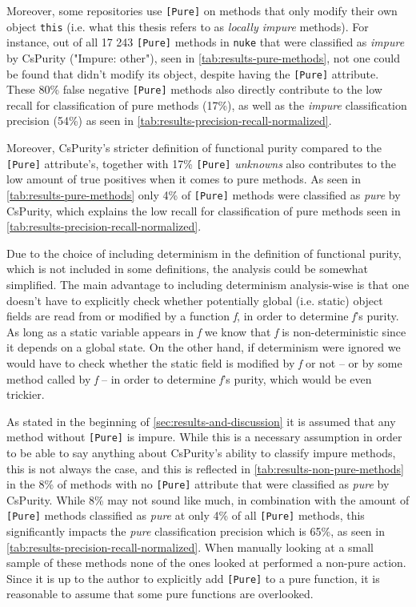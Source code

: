 \documentclass[a4paper,12pt]{article}
\begin{document}
Moreover, some repositories use \texttt{[Pure]} on methods that only modify their own object \texttt{this} (i.e. what this thesis refers to as \textit{locally impure} methods). For instance, out of all 17 243 \texttt{[Pure]} methods in \texttt{nuke} that were classified as \textit{impure} by CsPurity ("Impure: other"), seen in \autoref{tab:results-pure-methods}, not one could be found that didn't modify its object, despite having the \texttt{[Pure]} attribute. These 80\% false negative \texttt{[Pure]} methods also directly contribute to the low recall for classification of pure methods (17\%), as well as the \textit{impure} classification precision (54\%) as seen in \autoref{tab:results-precision-recall-normalized}.

Moreover, CsPurity's stricter definition of functional purity compared to the \texttt{[Pure]} attribute's, together with 17\% \texttt{[Pure]} \textit{unknowns} also contributes to the low amount of true positives when it comes to pure methods. As seen in \autoref{tab:results-pure-methods} only 4\% of \texttt{[Pure]} methods were classified as \textit{pure} by CsPurity, which explains the low recall for classification of pure methods seen in \autoref{tab:results-precision-recall-normalized}.

Due to the choice of including determinism in the definition of functional purity, which is not included in some definitions, the analysis could be somewhat simplified. The main advantage to including determinism analysis-wise is that one doesn't have to explicitly check whether potentially global (i.e. static) object fields are read from or modified by a function \textit{f}, in order to determine \textit{f}'s purity. As long as a static variable appears in \textit{f} we know that \textit{f} is non-deterministic since it depends on a global state. On the other hand, if determinism were ignored we would have to check whether the static field is modified by \textit{f} or not -- or by some method called by \textit{f} -- in order to determine \textit{f}'s purity, which would be even trickier.

As stated in the beginning of \autoref{sec:results-and-discussion} it is assumed that any method without \texttt{[Pure]} is impure. While this is a necessary assumption in order to be able to say anything about CsPurity's ability to classify impure methods, this is not always the case, and this is reflected in \autoref{tab:results-non-pure-methods} in the 8\% of methods with no \texttt{[Pure]} attribute that were classified as \textit{pure} by CsPurity. While 8\% may not sound like much, in combination with the amount of \texttt{[Pure]} methods classified as \textit{pure} at only 4\% of all \texttt{[Pure]} methods, this significantly impacts the \textit{pure} classification precision which is 65\%, as seen in \autoref{tab:results-precision-recall-normalized}. When manually looking at a small sample of these methods none of the ones looked at performed a non-pure action. Since it is up to the author to explicitly add \texttt{[Pure]} to a pure function, it is reasonable to assume that some pure functions are overlooked.
\end{document}
